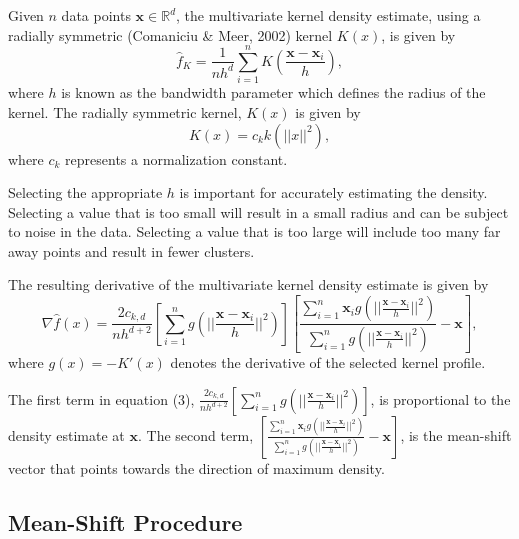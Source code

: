 \documentclass{article}
\begin{document}
Given $n$ data points $\mathbf{x}\in\mathbb{R}^d$, the multivariate kernel density estimate, using a radially symmetric (Comaniciu \& Meer, 2002) kernel $K(x)$, is given by
\begin{equation}
\hat{f}_K=\frac{1}{nh^d}\sum_{i=1}^nK\left(\frac{\mathbf{x}-\mathbf{x}_i}{h}\right),
\end{equation}
where $h$ is known as the bandwidth parameter which defines the radius of the kernel. The radially symmetric kernel, $K(x)$ is given by
\begin{equation}
K(x)=c_kk(||x||^2),
\end{equation}
where $c_k$ represents a normalization constant.

Selecting the appropriate $h$ is important for accurately estimating the density. Selecting a value that is too small will result in a small radius and can be subject to noise in the data. Selecting a value that is too large will include too many far away points and result in fewer clusters.

The resulting derivative of the multivariate kernel density estimate is given by
\begin{equation}
\nabla\hat{f}(x)=\frac{2c_{k,d}}{nh^{d+2}}
\left[\sum_{i=1}^ng\left(||\frac{\mathbf{x}-\mathbf{x}_i}{h}||^2\right)\right]
\left[\frac{\sum_{i=1}^n\mathbf{x}_ig\left(||\frac{\mathbf{x}-\mathbf{x}_i}{h}||^2\right)}{\sum_{i=1}^ng\left(||\frac{\mathbf{x}-\mathbf{x}_i}{h}||^2\right)}-\mathbf{x}\right],
\end{equation}
where $g(x) = -K'(x)$ denotes the derivative of the selected kernel profile.

The first term in equation (3), $\frac{2c_{k,d}}{nh^{d+2}}\left[\sum_{i=1}^ng\left(||\frac{\mathbf{x}-\mathbf{x}_i}{h}||^2\right)\right]$, is proportional to the density estimate at $\mathbf{x}$. The second term, $\left[\frac{\sum_{i=1}^n\mathbf{x}_ig\left(||\frac{\mathbf{x}-\mathbf{x}_i}{h}||^2\right)}{\sum_{i=1}^ng\left(||\frac{\mathbf{x}-\mathbf{x}_i}{h}||^2\right)}-\mathbf{x}\right]$, is the mean-shift vector that points towards the direction of maximum density.

\subsection{Mean-Shift Procedure}
\end{document}
